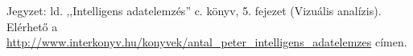 
Jegyzet: ld. ,,Intelligens adatelemzés'' c. könyv, 5. fejezet (Vizuális analízis). Elérhető a \url{http://www.interkonyv.hu/konyvek/antal_peter_intelligens_adatelemzes} címen.
